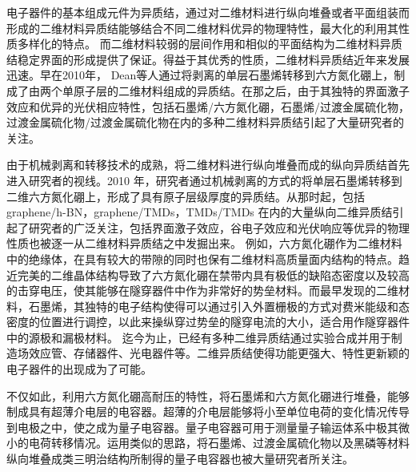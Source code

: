 电子器件的基本组成元件为异质结，通过对二维材料进行纵向堆叠或者平面组装而形成的二维材料异质结能够结合不同二维材料优异的物理特性，最大化的利用其性质多样化的特点。 而二维材料较弱的层间作用和相似的平面结构为二维材料异质结稳定界面的形成提供了保证。得益于其优秀的性质，二维材料异质结近年来发展迅速。早在2010年， Dean等人通过将剥离的单层石墨烯转移到六方氮化硼上，制成了由两个单原子层的二维材料组成的异质结。在那之后，由于其独特的界面激子效应和优异的光伏相应特性，包括石墨烯/六方氮化硼，石墨烯/过渡金属硫化物，过渡金属硫化物/过渡金属硫化物在内的多种二维材料异质结引起了大量研究者的关注。

由于机械剥离和转移技术的成熟，将二维材料进行纵向堆叠而成的纵向异质结首先进入研究者的视线。2010 年，研究者通过机械剥离的方式的将单层石墨烯转移到二维六方氮化硼上，形成了具有原子层级厚度的异质结。从那时起，包括 graphene/h-BN，graphene/TMDs，TMDs/TMDs 在内的大量纵向二维异质结引起了研究者的广泛关注，包括界面激子效应，谷电子效应和光伏响应等优异的物理性质也被逐一从二维材料异质结之中发掘出来。
例如，六方氮化硼作为二维材料中的绝缘体，在具有较大的带隙的同时也保有二维材料高质量面内结构的特点。趋近完美的二维晶体结构导致了六方氮化硼在禁带内具有极低的缺陷态密度以及较高的击穿电压，使其能够在隧穿器件中作为非常好的势垒材料。而最早发现的二维材料，石墨烯，其独特的电子结构使得可以通过引入外置栅极的方式对费米能级和态密度的位置进行调控，以此来操纵穿过势垒的隧穿电流的大小，适合用作隧穿器件中的源极和漏极材料。
迄今为止，已经有多种二维异质结通过实验合成并用于制造场效应管、存储器件、光电器件等。二维异质结使得功能更强大、特性更新颖的电子器件的出现成为了可能。


不仅如此，利用六方氮化硼高耐压的特性，将石墨烯和六方氮化硼进行堆叠，能够制成具有超薄介电层的电容器。超薄的介电层能够将小至单位电荷的变化情况传导到电极之中，使之成为量子电容器。量子电容器可用于测量量子输运体系中极其微小的电荷转移情况。运用类似的思路，将石墨烯、过渡金属硫化物以及黑磷等材料纵向堆叠成类三明治结构所制得的量子电容器也被大量研究者所关注。




